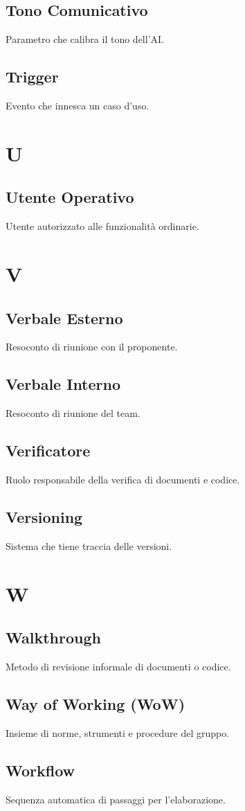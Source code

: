 \documentclass[a4paper,12pt]{article}
\begin{document}
\subsection{Tono Comunicativo}
Parametro che calibra il tono dell'AI.

\subsection{Trigger}
Evento che innesca un caso d'uso.

\section{U}
\subsection{Utente Operativo}
Utente autorizzato alle funzionalità ordinarie.

\section{V}
\subsection{Verbale Esterno}
Resoconto di riunione con il proponente.

\subsection{Verbale Interno}
Resoconto di riunione del team.

\subsection{Verificatore}
Ruolo responsabile della verifica di documenti e codice.

\subsection{Versioning}
Sistema che tiene traccia delle versioni.

\section{W}
\subsection{Walkthrough}
Metodo di revisione informale di documenti o codice.

\subsection{Way of Working (WoW)}
Insieme di norme, strumenti e procedure del gruppo.

\subsection{Workflow}
Sequenza automatica di passaggi per l'elaborazione.
\end{document}
